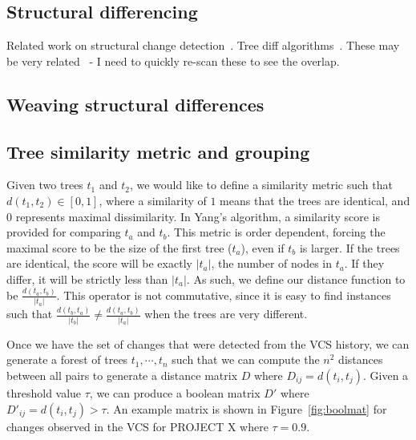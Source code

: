 \subsection{Structural differencing}

Related work on structural change detection~\cite{chawathe96change}.  Tree
diff algorithms~\cite{tai79tree, selkow77tree}.  These may be very
related~\cite{weissgerber06identify, kim07automatic, neamtiu05understand} - I
need to quickly re-scan these to see the overlap.

\subsection{Weaving structural differences}

\subsection{Tree similarity metric and grouping}

Given two trees $t_1$ and $t_2$, we would like to define a similarity metric
such that $d(t_1, t_2) \in [0,1]$, where a similarity of $1$ means that the
trees are identical, and $0$ represents maximal dissimilarity.  In Yang's
algorithm, a similarity score is provided for comparing $t_a$ and $t_b$. This
metric is order dependent, forcing the maximal score to be the size of the
first tree ($t_a$), even if $t_b$ is larger.  If the trees are identical, the
score will be exactly $|t_a|$, the number of nodes in $t_a$.  If they differ,
it will be strictly less than $|t_a|$.  As such, we define our distance
function to be $\frac{d(t_a, t_b)}{|t_a|}$.  This operator is not commutative,
since it is easy to find instances such that $\frac{d(t_b, t_a)}{|t_b|} \neq
\frac{d(t_a, t_b)}{|t_a|}$ when the trees are very different.

Once we have the set of changes that were detected from the VCS history,
we can generate a forest of trees $t_1, \cdots, t_n$ such that we can
compute the $n^2$ distances between all pairs to generate a distance matrix
$D$ where $D_{ij} = d(t_i, t_j)$.  Given a threshold value $\tau$, we can
produce a boolean matrix $D'$ where $D'_{ij} = d(t_i, t_j) > \tau$.  An
example matrix is shown in Figure~\ref{fig:boolmat} for changes observed
in the VCS for PROJECT X where $\tau = 0.9$.  

